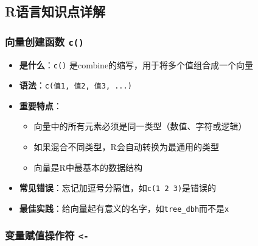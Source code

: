\documentclass[
  twoside]{book}
\providecommand{\tightlist}{%
  \setlength{\itemsep}{0pt}\setlength{\parskip}{0pt}}
\begin{document}
\hypertarget{rux8bedux8a00ux77e5ux8bc6ux70b9ux8be6ux89e3}{%
\subsection{R语言知识点详解}\label{rux8bedux8a00ux77e5ux8bc6ux70b9ux8be6ux89e3}}

\hypertarget{ux5411ux91cfux521bux5efaux51fdux6570-c}{%
\subsubsection{\texorpdfstring{向量创建函数 \texttt{c()}}{向量创建函数 c()}}\label{ux5411ux91cfux521bux5efaux51fdux6570-c}}

\begin{itemize}
\tightlist
\item
  \textbf{是什么}：\texttt{c()} 是combine的缩写，用于将多个值组合成一个向量
\item
  \textbf{语法}：\texttt{c(值1,\ 值2,\ 值3,\ ...)}
\item
  \textbf{重要特点}：

  \begin{itemize}
  \tightlist
  \item
    向量中的所有元素必须是同一类型（数值、字符或逻辑）
  \item
    如果混合不同类型，R会自动转换为最通用的类型
  \item
    向量是R中最基本的数据结构
  \end{itemize}
\item
  \textbf{常见错误}：忘记加逗号分隔值，如\texttt{c(1\ 2\ 3)}是错误的
\item
  \textbf{最佳实践}：给向量起有意义的名字，如\texttt{tree\_dbh}而不是\texttt{x}
\end{itemize}

\hypertarget{ux53d8ux91cfux8d4bux503cux64cdux4f5cux7b26--}{%
\subsubsection{\texorpdfstring{变量赋值操作符 \texttt{\textless{}-}}{变量赋值操作符 \textless-}}\label{ux53d8ux91cfux8d4bux503cux64cdux4f5cux7b26--}}
\end{document}
